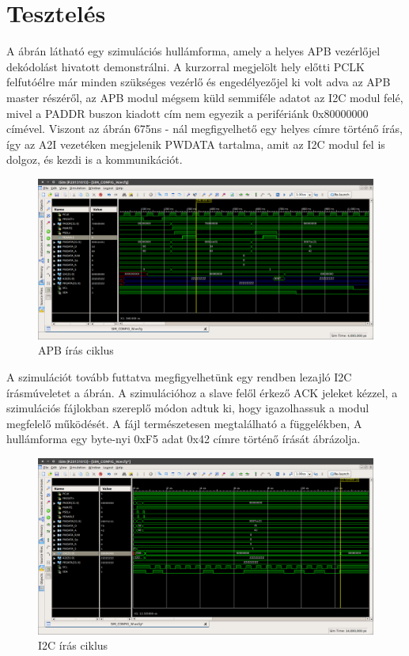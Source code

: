 \chapter{Tesztelés}
\label{sec:testing}

A  ábrán látható egy szimulációs hullámforma, amely a helyes APB vezérlőjel dekódolást hivatott demonstrálni. A kurzorral megjelölt hely előtti PCLK felfutóélre már minden szükséges vezérlő és engedélyezőjel ki volt adva az APB master részéről, az APB modul mégsem küld semmiféle adatot az I2C modul felé, mivel a PADDR buszon kiadott cím nem egyezik a perifériánk 0x80000000 címével. Viszont az ábrán 675ns - nál megfigyelhető egy helyes címre történő írás, így az A2I vezetéken megjelenik PWDATA tartalma, amit az I2C modul fel is dolgoz, és kezdi is a kommunikációt.
\begin{figure}[ht!]
    \includegraphics[width=\textwidth]{figures/APB_invalidwrite.png}
    \caption{APB írás ciklus}
    \label{fig:APBwrite}
\end{figure}

A szimulációt tovább futtatva megfigyelhetünk egy rendben lezajló I2C írásmúveletet a  ábrán. A szimulációhoz a slave felől érkező ACK jeleket kézzel, a szimulációs fájlokban szereplő módon adtuk ki, hogy igazolhassuk a modul megfelelő működését. A fájl természetesen megtalálható a függelékben, %
A hullámforma egy byte-nyi 0xF5 adat 0x42 címre történő írását ábrázolja.
\begin{figure}[ht!]
    \includegraphics[width=\textwidth]{figures/I2C_W2.png}
    \caption{I2C írás ciklus}
    \label{fig:I2Cwrite}
\end{figure}

